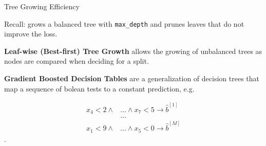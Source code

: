 \begin{vbframe}{Tree Growing Efficiency}

Recall:  grows a balanced tree with \texttt{max\_depth} and prunes leaves that do not improve the loss.

\lz

\textbf{Leaf-wise (Best-first) Tree Growth} allows the growing of unbalanced trees as nodes are compared when deciding for a split.

\lz

\textbf{Gradient Boosted Decision Tables} are a generalization of decision trees that map a sequence of bolean tests to a constant prediction, e.g.

\begin{align*}
x_4 < 2 \wedge &\dots \wedge x_7 < 5 \rightarrow \hat{b}^{[1]} \\
&\dots \\
x_1 < 9 \wedge &\dots \wedge x_5 < 0 \rightarrow \hat{b}^{[M]}
\end{align*}.


\end{vbframe}

